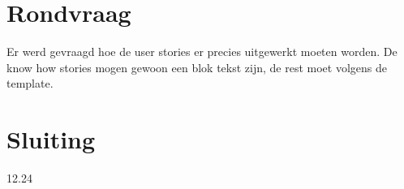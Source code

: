 \documentclass{article}
\begin{document}
\section{Rondvraag}
Er werd gevraagd hoe de user stories er precies uitgewerkt moeten worden. De know how stories mogen gewoon een blok tekst zijn, de rest moet volgens de template.

\section{Sluiting}
12.24

\end{document}
